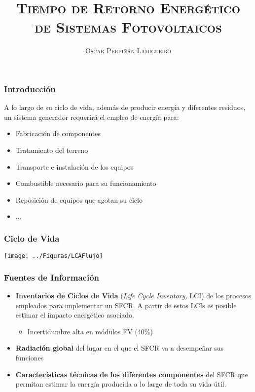 \documentclass[serif, xcolor=dvipsnames]{beamer}
\begin{document}
\title[\textsc{EPBT}]{\textsc{Tiempo de Retorno Energético}\\
  \textsc{de Sistemas Fotovoltaicos}}


\author{\textsc{Oscar Perpiñán Lamigueiro}}

\date{}

\frame[plain]{\titlepage}

%

\begin{frame}
  \frametitle{Introducción} A lo largo de su ciclo de vida, además de
  producir energía y diferentes residuos, un sistema generador
  requerirá el empleo de energía para:
  \begin{itemize}
  \item Fabricación de componentes
  \item Tratamiento del terreno
  \item Transporte e instalación de los equipos
  \item Combustible necesario para su funcionamiento
  \item Reposición de equipos que agotan su ciclo
  \item ...
  \end{itemize}
\end{frame}

\begin{frame}
  \frametitle{Ciclo de Vida}

  \texttt{[image: ../Figuras/LCAFlujo]}
  
\end{frame}

\begin{frame}
  \frametitle{Fuentes de Información}
  \begin{itemize}
  \item \textbf{Inventarios de Ciclos de Vida} (\emph{Life Cycle
      Inventory,} LCI) de los procesos empleados para implementar un
    SFCR. A partir de estos LCIs es posible estimar el impacto
    energético asociado.
    \begin{itemize}
    \item Incertidumbre alta en módulos FV (40\%)
    \end{itemize}
  \item \textbf{Radiación global} del lugar en el que el SFCR va a
    desempeñar sus funciones
  \item \textbf{Características técnicas de los diferentes
      componentes} del SFCR que permitan estimar la energía producida
    a lo largo de toda su vida útil.
  \end{itemize}
 
\end{frame}
\end{document}
